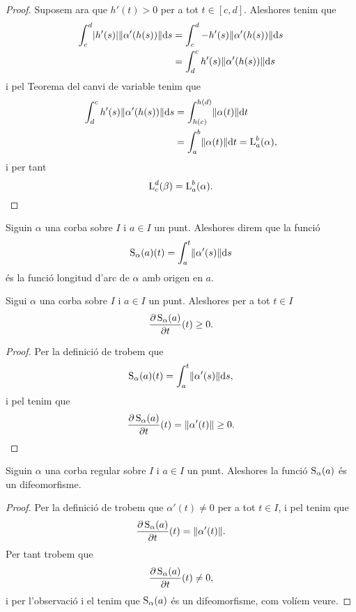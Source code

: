 \documentclass[../Apunts.tex]{subfiles}
\begin{document}
\begin{proposition}
\begin{proof}
			Suposem ara que \(h'(t)>0\) per a tot \(t\in[c,d]\). Aleshores tenim que
			\begin{align*}
				\int_{c}^{d}\abs{h'(s)}\norm{\alpha'(h(s))}\diff s&=\int_{c}^{d}-h'(s)\norm{\alpha'(h(s))}\diff s \\
				&=\int_{d}^{c}h'(s)\norm{\alpha'(h(s))}\diff s
			\end{align*}
			i pel Teorema del canvi de variable tenim que %
			\begin{align*}
				\int_{d}^{c}h'(s)\norm{\alpha'(h(s))}\diff s&=\int_{h(c)}^{h(d)}\norm{\alpha(t)}\diff t \\
				&=\int_{a}^{b}\norm{\alpha(t)}\diff t=\Long_{a}^{b}(\alpha),
			\end{align*}
			i per tant
			\[\operatorname{L}_{c}^{d}(\beta)=\operatorname{L}_{a}^{b}(\alpha).\qedhere\]
		\end{proof}
	\end{proposition}
	\begin{definition}
		\label{def:funció longitud d'arc}
		Siguin \(\alpha\) una corba sobre \(I\) i \(a\in I\) un punt. Aleshores direm que la funció
		\[\funciolongituddarc_{\alpha}(a)(t)=\int_{a}^{t}\norm{\alpha'(s)}\diff s\]
		és la funció longitud d'arc de \(\alpha\) amb origen en \(a\).
	\end{definition}
	\begin{observation}
		\label{obs:la funció longitud d'arc és creixent}
		Sigui \(\alpha\) una corba sobre \(I\) i \(a\in I\) un punt. Aleshores per a tot \(t\in I\)
		\[\frac{\partial\operatorname{S}_{\alpha}(a)}{\partial t}(t)\geq0.\]
		\begin{proof}
			Per la definició de  trobem que
			\[\funciolongituddarc_{\alpha}(a)(t)=\int_{a}^{t}\norm{\alpha'(s)}\diff s,\]
			i pel  tenim que
			\[\frac{\partial\funciolongituddarc_{\alpha}(a)}{\partial t}(t)=\norm{\alpha'(t)}\geq0.\qedhere\] %
		\end{proof}
	\end{observation}
	\begin{proposition}
		\label{prop:la funció longitud arc d'una corba regular és un difeomorfisme}
		Siguin \(\alpha\) una corba regular sobre \(I\) i \(a\in I\) un punt. Aleshores la funció \(\operatorname{S}_{\alpha}(a)\) és un difeomorfisme. %
		\begin{proof}
			Per la definició de  trobem que \(\alpha'(t)\neq0\) per a tot \(t\in I\), i pel  tenim que
			\[\frac{\partial\funciolongituddarc_{\alpha}(a)}{\partial t}(t)=\norm{\alpha'(t)}.\]
			Per tant trobem que %
			\[\frac{\partial\operatorname{S}_{\alpha}(a)}{\partial t}(t)\neq0,\]
			i per l'observació  i el \corollari 		{} tenim que \(\operatorname{S}_{\alpha}(a)\) és un difeomorfisme, com volíem veure. %
		\end{proof}
	\end{proposition}
\end{document}
